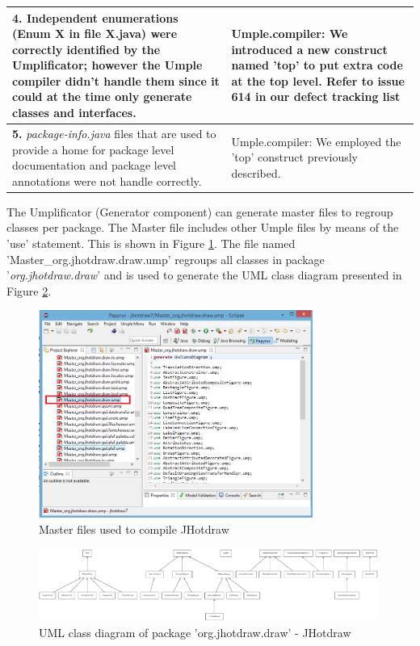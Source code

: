 \begin{table}[htbp]
\begin{tabularx}{\textwidth}{X|X}
\textbf{4.} Independent enumerations (Enum X in file X.java) were correctly identified by the Umplificator; however the Umple compiler didn't handle them since it could at the time only generate classes and interfaces. 
  &  Umple.compiler: We introduced a new construct named 'top' to put extra code at the top level. Refer to issue 614 in our defect tracking list \cite{UmpleIssues} \\ \hline

\textbf{5.} \textit{package-info.java} files that are used to provide a home for package level documentation and package level annotations were not handle correctly.
  &  Umple.compiler: We employed the 'top' construct previously described.    
 \\ \hline
\end{tabularx}
\end{table}

The Umplificator (Generator component) can generate master files to regroup classes per package. The Master file includes other Umple files by means of the 'use' statement. This is shown in Figure \ref{fig:jhotdrawMasterDraw}. The file named 'Master\_org.jhotdraw.draw.ump' regroups all classes in package '\textit{org.jhotdraw.draw}' and is used to generate the UML class diagram presented in Figure  \ref{fig:jhotdrawUMLClass}.

\begin{figure}[h]
\centering
\includegraphics[width=0.80\textwidth]{Figures/jhotdrawMasterDraw.png} 
\caption{Master files used to compile JHotdraw}
\label{fig:jhotdrawMasterDraw}
\end{figure}

\newpage
\begin{figure}
\includegraphics[width=0.99\textwidth]{Figures/jhotdrawuml.pdf} 
\caption{UML class diagram of package 'org.jhotdraw.draw' -  JHotdraw}
\label{fig:jhotdrawUMLClass}
\end{figure}

